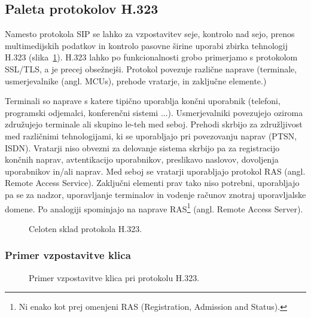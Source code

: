 \documentclass{acm_proc_article-sp}
\begin{document}
\subsection{Paleta protokolov H.323}

Namesto protokola SIP se lahko za vzpostavitev seje, kontrolo nad sejo, prenos multimedijskih podatkov in kontrolo pasovne širine uporabi zbirka tehnologij H.323 (slika~\ref{fig:h323}). H.323 lahko po funkcionalnosti grobo primerjamo s protokolom SSL/TLS, a je precej obsežnejši. Protokol povezuje različne naprave (terminale, usmerjevalnike (angl. MCUs), prehode vratarje, in zaključne elemente.)

Terminali so naprave s katere tipično uporablja končni uporabnik (telefoni, programski odjemalci, konferenčni sistemi ...). Usmerjevalniki povezujejo oziroma združujejo terminale ali skupino le-teh med seboj. Prehodi skrbijo za združljivost med različnimi tehnologijami, ki se uporabljajo pri povezovanju naprav (PTSN, ISDN). Vratarji niso obvezni za delovanje sistema skrbijo pa za registracijo končnih naprav, avtentikacijo uporabnikov, preslikavo naslovov, dovoljenja uporabnikov in/ali naprav. Med seboj se vratarji uporabljajo protokol RAS (angl. Remote Access Service). Zaključni elementi prav tako niso potrebni, uporabljajo pa se za nadzor, uporavljanje terminalov in vodenje računov znotraj uporavljalske domene. Po analogiji spominjajo na naprave RAS\footnote{Ni enako kot prej omenjeni RAS (Registration, Admission and Status).} (angl. Remote Access Server).

\begin{figure}
\centering
{} %
\caption{Celoten sklad protokola H.323.}
\label{fig:h323}
\end{figure}



\subsubsection{Primer vzpostavitve klica}

\begin{figure}
\centering
{} %
\caption{Primer vzpostavitve klica pri protokolu H.323.}
\label{fig:h323-call}
\end{figure}
\end{document}

